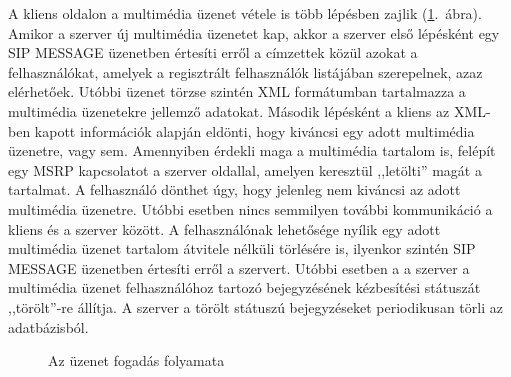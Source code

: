 A kliens oldalon a multimédia üzenet vétele is több lépésben zajlik (\ref{fig:receiving_proc}.~ábra). Amikor a szerver új multimédia üzenetet kap, akkor a szerver első lépésként egy SIP MESSAGE üzenetben értesíti erről a címzettek közül azokat a felhasználókat, amelyek a regisztrált felhasználók listájában szerepelnek, azaz elérhetőek. Utóbbi üzenet törzse szintén XML formátumban tartalmazza a multimédia üzenetekre jellemző adatokat. Második lépésként a kliens az XML-ben kapott információk alapján eldönti, hogy kiváncsi egy adott multimédia üzenetre, vagy sem. Amennyiben érdekli maga a multimédia tartalom is, felépít egy MSRP kapcsolatot a szerver oldallal, amelyen keresztül ,,letölti'' magát a tartalmat. A felhasználó dönthet úgy, hogy jelenleg nem kiváncsi az adott multimédia üzenetre. Utóbbi esetben nincs semmilyen további kommunikáció a kliens és a szerver között. A felhasználónak lehetősége nyílik egy adott multimédia üzenet tartalom átvitele nélküli törlésére is, ilyenkor szintén SIP MESSAGE üzenetben értesíti erről a szervert. Utóbbi esetben a a szerver a multimédia üzenet felhasználóhoz tartozó bejegyzésének kézbesítési státuszát ,,törölt''-re állítja. A szerver a törölt státuszú bejegyzéseket periodikusan törli az adatbázisból.

\begin{figure}[htbp]
\center
{}
\caption{Az üzenet fogadás folyamata}
\label{fig:receiving_proc}
\end{figure}

